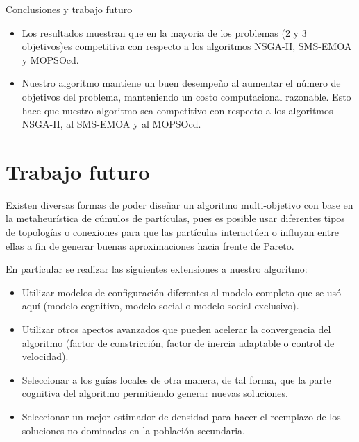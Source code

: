 \begin{chapter}{Conclusiones y trabajo futuro}
\begin{itemize}
  \item Los resultados \DIFaddbegin {}\DIFaddend muestran que en la mayoria de los problemas (2 y 3 objetivos)\DIFdelbegin {}\DIFdelend \DIFaddbegin {}\DIFaddend es competitiva
  con respecto a los algoritmos NSGA-II, SMS-EMOA y MOPSOcd.

  \item Nuestro algoritmo mantiene un buen desempe\~no al aumentar el n\'umero de objetivos del problema, manteniendo un costo computacional 
  razonable. Esto hace que nuestro algoritmo sea competitivo con respecto a los algoritmos NSGA-II, al SMS-EMOA y al MOPSOcd.
  \end{itemize}

  \section{Trabajo futuro}

  Existen diversas formas de poder dise\~nar un algoritmo multi-objetivo con base en la metaheur\'istica de c\'umulos de 
  part\'iculas, pues es posible usar diferentes tipos de topolog\'ias o conexiones para que las part\'iculas interact\'uen o 
  influyan entre ellas a fin de \DIFdelbegin {}\DIFdelend generar buenas aproximaciones hacia \DIFaddbegin {}\DIFaddend frente de Pareto.

  En particular se \DIFdelbegin {}\DIFdelend \DIFaddbegin {}\DIFaddend realizar las siguientes extensiones a nuestro algoritmo:

  \begin{itemize}
  \item Utilizar modelos de configuraci\'on diferentes al modelo completo que se us\'o aqu\'i 
   (modelo cognitivo, modelo social o modelo social exclusivo). 
  \item Utilizar otros apectos avanzados que pueden acelerar la convergencia del algoritmo (factor de constricci\'on, factor de inercia 
  adaptable o control de velocidad).

 \item Seleccionar a los gu\'ias locales de otra manera, de tal forma, que \DIFdelbegin {}\DIFdelend \DIFaddbegin {}\DIFaddend la parte cognitiva del algoritmo permitiendo
 generar nuevas soluciones.

 \item Seleccionar un mejor estimador de densidad para hacer el reemplazo de los soluciones no dominadas en la poblaci\'on secundaria.

 \end{itemize}  
\end{chapter}